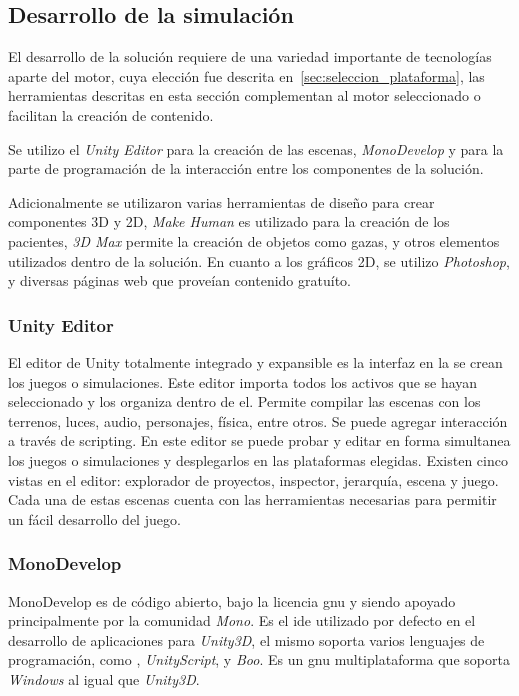 \subsection{Desarrollo de la simulación}

El desarrollo de la solución requiere de una variedad importante de tecnologías
aparte del motor, cuya elección fue descrita en~\ref{sec:seleccion_plataforma},
las herramientas descritas en esta sección complementan al motor seleccionado o
facilitan la creación de contenido.

Se utilizo el \textit{Unity Editor} para la creación de las escenas,
\textit{MonoDevelop} y \cs para la parte de programación de la interacción entre
los componentes de la solución.

Adicionalmente se utilizaron varias herramientas de diseño para crear
componentes 3D y 2D, \textit{Make Human} es utilizado para la creación de los
pacientes, \textit{3D Max} permite la creación de objetos como gazas, y otros
elementos utilizados dentro de la solución. En cuanto a los gráficos 2D, se
utilizo \textit{Photoshop}, y diversas páginas web que proveían contenido
gratuíto.

\subsubsection{Unity Editor}

El editor de Unity totalmente integrado y expansible es la interfaz en la se
crean los juegos o simulaciones. Este editor importa todos los activos que se
hayan seleccionado y los organiza dentro de el. Permite compilar las escenas con
los terrenos, luces, audio, personajes, física, entre otros. Se puede agregar
interacción a través de scripting. En este editor se puede probar y editar en
forma simultanea los juegos o simulaciones y desplegarlos en las plataformas
elegidas. Existen cinco vistas en el editor: explorador de proyectos, inspector,
jerarquía, escena y juego. Cada una de estas escenas cuenta con las herramientas
necesarias para permitir un fácil desarrollo del juego\cite{unity3d}.


\subsubsection{MonoDevelop}

MonoDevelop es de código abierto, bajo la licencia \Gls{gnu} y siendo apoyado
principalmente por la comunidad \textit{Mono}. Es el \Gls{ide} utilizado por
defecto en el desarrollo de aplicaciones para \textit{Unity3D}, el mismo soporta
varios lenguajes de programación, como \cs, \textit{UnityScript}, y
\textit{Boo}. Es un \Gls{gnu} multiplataforma que soporta \textit{Windows} al
igual que \textit{Unity3D}.

